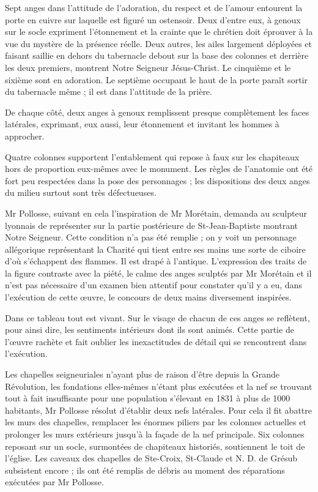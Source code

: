 Sept anges dans l'attitude de l'adoration, du respect et de l'amour entourent la porte en cuivre sur laquelle est figuré un ostensoir. Deux d'entre eux, à genoux sur le socle expriment l'étonnement et la crainte que le chrétien doit éprouver à la vue du mystère de la présence réelle. Deux autres, les ailes largement déployées et faisant saillie en dehors du tabernacle debout sur la base des colonnes et derrière les deux premiers, montrent Notre Seigneur Jésus-Christ. Le cinquième et le sixième sont en adoration. Le septième occupant le haut de la porte paraît sortir du tabernacle même ; il est dans l'attitude de la prière.

De chaque côté, deux anges à genoux remplissent presque complètement les faces latérales, exprimant, eux aussi, leur étonnement et invitant les hommes à approcher.

Quatre colonnes supportent l'entablement qui repose à faux sur les chapiteaux hors de proportion eux-mêmes avec le monument. Les règles de l'anatomie ont été fort peu respectées dans la pose des personnages ; les dispositions des deux anges du milieu surtout sont très défectueuses.

Mr Pollosse, suivant en cela l'inspiration de Mr Morétain, demanda au sculpteur lyonnais de représenter sur la partie postérieure de St-Jean-Baptiste montrant Notre Seigneur. Cette condition n'a pas été remplie ; on y voit un personnage allégorique représentant la Charité qui tient entre ses mains une sorte de ciboire d'où s'échappent des flammes. Il est drapé à l'antique. L'expression des traits de la figure contraste avec la piété, le calme des anges sculptés par Mr Morétain et il n'est pas nécessaire d'un examen bien attentif pour constater qu'il y a eu, dans l'exécution de cette œuvre, le concours de deux mains diversement inspirées.

Dans ce tableau tout est vivant. Sur le visage de chacun de ces anges se reflètent, pour ainsi dire, les sentiments intérieurs dont ils sont animés. Cette partie de l'œuvre rachète et fait oublier les inexactitudes de détail qui se rencontrent dans l'exécution.

Les chapelles seigneuriales n'ayant plus de raison d'être depuis la Grande Révolution, les fondations elles-mêmes n'étant plus exécutées et la nef se trouvant tout à fait insuffisante pour une population s'élevant en 1831 à plus de 1000 habitants, Mr Pollosse résolut d'établir deux nefs latérales. Pour cela il fit abattre les murs des chapelles, remplacer les énormes piliers par les colonnes actuelles et prolonger les murs extérieurs jusqu'à la façade de la nef principale. Six colonnes reposant sur un socle, surmontées de chapiteaux historiés, soutiennent le toit de l'église. Les caveaux des chapelles de Ste-Croix, St-Claude et N. D. de Grésub subsistent encore ; ils ont été remplis de débris au moment des réparations exécutées par Mr Pollosse.

